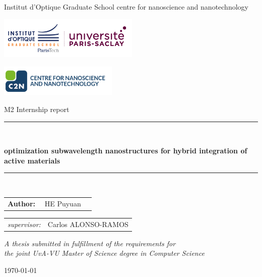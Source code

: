 \documentclass[]{article}
\begin{document}
\thispagestyle{empty}

\begin{center}

\hspace*{0.9cm} Institut d'Optique Graduate School \hspace*{1.8cm} centre for nanoscience and nanotechnology 

\vspace{1mm}

\hspace*{-6.5cm}\includegraphics[height=20mm]{figures/logo/iogs.png}

\vspace*{-1.8cm}\hspace*{7.5cm}\includegraphics[height=15mm]{figures/logo/c2n.png}

\vspace{2cm}

{\Large M2 Internship report}

\vspace*{1.5cm}

\rule{.9\linewidth}{.6pt}\\[0.4cm]
{\huge \bfseries optimization subwavelength nanostructures for hybrid integration of active materials\par}\vspace{0.4cm}
\rule{.9\linewidth}{.6pt}\\[1.5cm]

\vspace*{2mm}

{\Large
\begin{tabular}{l}
{\bf Author:} ~~HE Puyuan~~
\end{tabular}
}

\vspace*{2cm}

\begin{tabular}{ll}
{\it supervisor:}   & Carlos ALONSO-RAMOS \\
\end{tabular}

\vspace*{2.5cm}

\textit{A thesis submitted in fulfillment of the requirements for\\ the joint UvA-VU Master of Science degree in Computer Science}

\vspace*{1.8cm}

\today\\[4cm] %

\end{center}
\end{document}
